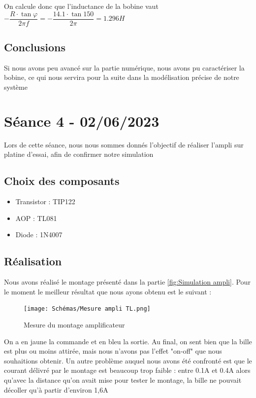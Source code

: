 \documentclass[11pt,a4paper]{article}
\begin{document}
On calcule donc que l'inductance de la bobine vaut $-\dfrac{R\cdot \tan \varphi}{2\pi f} = -\dfrac{14.1\cdot \tan 150}{2\pi}\boxed{=1.296H}$

\subsection{Conclusions}
Si nous avons peu avancé sur la partie numérique, nous avons pu caractériser la bobine, ce qui nous servira pour la suite dans la modélisation précise de notre système

\section{Séance 4 - 02/06/2023}
Lors de cette séance, nous nous sommes donnés l'objectif de réaliser l'ampli sur platine d'essai, afin de confirmer notre simulation

\subsection{Choix des composants}
\begin{itemize}
\item Transistor : TIP122
\item AOP : TL081
\item Diode : 1N4007
\end{itemize}

\subsection{Réalisation}
Nous avons réalisé le montage présenté dans la partie \ref{fig:Simulation ampli}. Pour le moment le meilleur résultat que nous ayons obtenu est le suivant :

\begin{figure} [H]
\begin{center}
\texttt{[image: Schémas/Mesure ampli TL.png]} 
\end{center}
\caption{Mesure du montage amplificateur}
\end{figure}

On a en jaune la commande et en bleu la sortie. Au final, on sent bien que la bille est plus ou moins attirée, mais nous n'avons pas l'effet "on-off" que nous souhaitions obtenir.
Un autre problème auquel nous avons été confronté est que le courant délivré par le montage est beaucoup trop faible : entre 0.1A et 0.4A alors qu'avec la distance qu'on avait mise pour tester le montage, la bille ne pouvait décoller qu'à partir d'environ 1,6A
\end{document}
